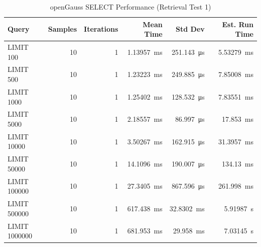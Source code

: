 \documentclass[14pt,a4paper]{article}
\begin{document}
    \begin{table}[H]
        \centering        
        \begin{tabular}{lrrrrr}
            \toprule
            \textbf{Query} & \textbf{Samples} & \textbf{Iterations} & \textbf{Mean Time} & \textbf{Std Dev} & \textbf{Est. Run Time} \\
            \midrule
            LIMIT 100 & 10 & 1 & \qty{1.13957}{\milli\second} & \qty{251.143}{\micro\second} & \qty{5.53279}{\milli\second} \\
            LIMIT 500 & 10 & 1 & \qty{1.23223}{\milli\second} & \qty{249.885}{\micro\second} & \qty{7.85008}{\milli\second} \\
            LIMIT 1000 & 10 & 1 & \qty{1.25402}{\milli\second} & \qty{128.532}{\micro\second} & \qty{7.83551}{\milli\second} \\
            LIMIT 5000 & 10 & 1 & \qty{2.18557}{\milli\second} & \qty{86.997}{\micro\second} & \qty{17.853}{\milli\second} \\
            LIMIT 10000 & 10 & 1 & \qty{3.50267}{\milli\second} & \qty{162.915}{\micro\second} & \qty{31.3957}{\milli\second} \\
            LIMIT 50000 & 10 & 1 & \qty{14.1096}{\milli\second} & \qty{190.007}{\micro\second} & \qty{134.13}{\milli\second} \\
            LIMIT 100000 & 10 & 1 & \qty{27.3405}{\milli\second} & \qty{867.596}{\micro\second} & \qty{261.998}{\milli\second} \\
            LIMIT 500000 & 10 & 1 & \qty{617.438}{\milli\second} & \qty{32.8302}{\milli\second} & \qty{5.91987}{\second} \\
            LIMIT 1000000 & 10 & 1 & \qty{681.953}{\milli\second} & \qty{29.958}{\milli\second} & \qty{7.03145}{\second} \\
            \bottomrule
        \end{tabular}
        \caption{openGauss SELECT Performance (Retrieval Test 1)}
    \end{table}
    
\end{document}
